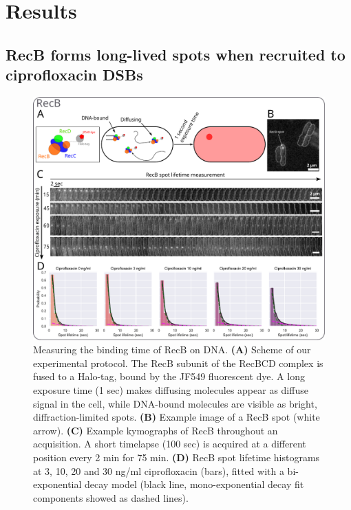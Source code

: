 \section*{Results}

\subsection*{RecB forms long-lived spots when recruited to cipro\-floxacin DSBs}

\begin{figure}[htbp]
    \centering
    \includegraphics[width=.8\textwidth]{Figures/Fig1_RecB_lifetime.pdf}
    \caption{Measuring the binding time of RecB on DNA. \textbf{(A)} Scheme of our experimental protocol. The RecB subunit of the RecBCD complex is fused to a Halo-tag, bound by the JF549 fluorescent dye. A long exposure time (1 sec) makes diffusing molecules appear as diffuse signal in the cell, while DNA-bound molecules are visible as bright, diffraction-limited spots. \textbf{(B)} Example image of a RecB spot (white arrow). \textbf{(C)} Example kymographs of RecB throughout an acquisition. A short timelapse (100 sec) is acquired at a different position every 2 min for 75 min. \textbf{(D)} RecB spot lifetime histograms at 3, 10, 20 and 30 ng/ml ciprofloxacin (bars), fitted with a bi-exponential decay model (black line, mono-exponential decay fit components showed as dashed lines).}
    \label{Fig:lifetimes}
\end{figure}

